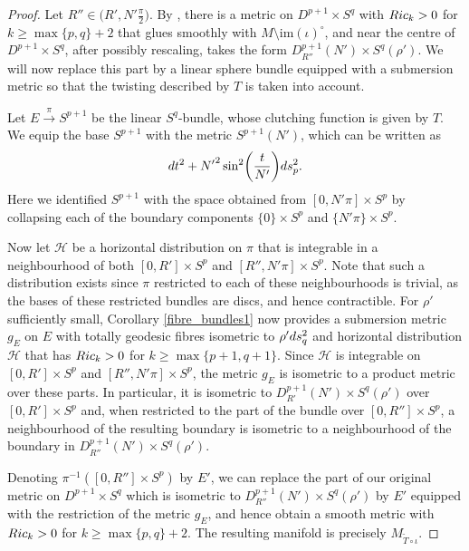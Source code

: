 \documentclass[11pt]{article}
\numberwithin{equation}{section}
\numberwithin{equation}{section}
\begin{document}
\begin{proof}
	Let $R''\in\bigl(R',N'\frac{\pi}{2}\bigr)$. By \cite[Theorem C and Remark 4.2]{RW}, there is a metric on $D^{p+1}\times S^q$ with ${\rm Ric}_k>0$ for $k\geq\max\{p,q\}+2$ that glues smoothly with $M\setminus\mathrm{im}(\iota)^\circ$, and near the centre of~${D^{p+1}\times S^q}$, after possibly rescaling, takes the form $D^{p+1}_{R''}(N')\times S^q(\rho')$. We will now replace this part by a linear sphere bundle equipped with a submersion metric so that the twisting described by $T$ is taken into account.
	
	Let $E\xrightarrow{\pi}S^{p+1}$ be the linear $S^q$-bundle, whose clutching function is given by $T$. We equip the base $S^{p+1}$ with the metric $S^{p+1}(N')$, which can be written as
	\[{\rm d}t^2+{N'}^2\sin^2\biggl(\frac{t}{N'} \biggr){\rm d}s_p^2. \]	
	Here we identified $S^{p+1}$ with the space obtained from $[0,N'\pi]\times S^p$ by collapsing each of the boundary components $\{0 \}\times S^p$ and $\{N'\pi \}\times S^p$.
	
	Now let $\mathcal{H}$ be a horizontal distribution on $\pi$ that is integrable in a neighbourhood of both $[0,R']\times S^p$ and $[R'',N'\pi]\times S^p$. Note that such a distribution exists since $\pi$ restricted to each of these neighbourhoods is trivial, as the bases of these restricted bundles are discs, and hence contractible. For $\rho'$ sufficiently small, Corollary \ref{fibre_bundles1} now provides a submersion metric $g_E$ on $E$ with totally geodesic fibres isometric to $\rho'{\rm d}s_q^2$ and horizontal distribution $\mathcal{H}$ that has ${\rm Ric}_k>0$ for $k\geq\max\{p+1,q+1 \}$. Since $\mathcal{H}$ is integrable on $[0,R']\times S^p$ and $[R'',N'\pi]\times S^p$, the metric $g_E$ is isometric to a product metric over these parts. In particular, it is isometric to $D^{p+1}_{R'}(N')\times S^q(\rho')$ over $[0,R']\times S^p$ and, when restricted to the part of the bundle over $[0,R'']\times S^p$, a neighbourhood of the resulting boundary is isometric to a neighbourhood of the boundary in $D^{p+1}_{R''}(N')\times S^q(\rho')$.
	
Denoting $\pi^{-1}([0,R'']\times S^p)$ by $E'$, we can replace the part of our original metric on $D^{p+1}\times S^q$ which is isometric to $D^{p+1}_{R''}(N')\times S^q(\rho')$ by $E'$ equipped with the restriction of the metric $g_E$, and hence obtain a smooth metric with ${\rm Ric}_k>0$ for $k\geq \max\{p,q\}+2$. The resulting manifold is precisely $M_{\tilde{T}\circ \iota}$.
\end{proof}
\end{document}
